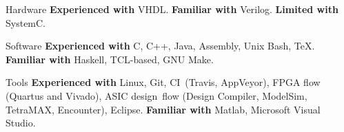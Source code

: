 
\begin{cvskills}

\cvskill
{Hardware}
{\textbf{Experienced with} VHDL. \textbf{Familiar with} Verilog. 
\textbf{Limited with} SystemC.}

\cvskill
{Software}
{\textbf{Experienced with} C, C++, Java, Assembly, Unix Bash, TeX. 
\textbf{Familiar with} Haskell, TCL-based, GNU Make.}

\cvskill
{Tools}
{\textbf{Experienced with} Linux, Git, CI~(Travis, AppVeyor), FPGA 
flow (Quartus and Vivado), ASIC design~flow (Design Compiler, ModelSim, 
TetraMAX, Encounter), Eclipse. \textbf{Familiar with} Matlab, 
Microsoft Visual 
Studio.}

\end{cvskills}

